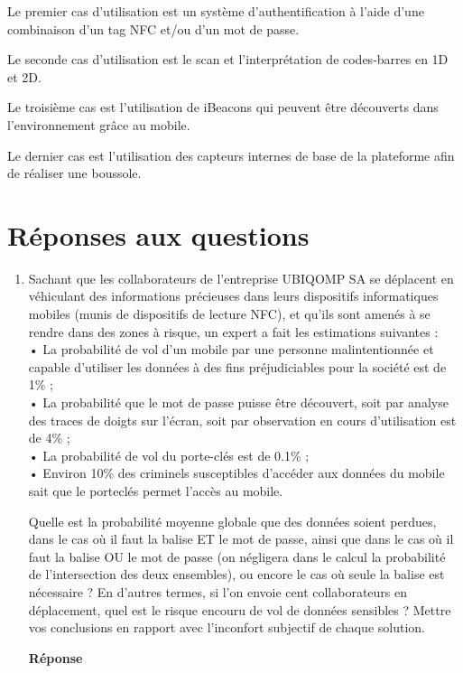 \documentclass[a4paper]{article}
\begin{document}
Le premier cas d'utilisation est un système d'authentification à l'aide d'une combinaison d'un tag NFC et/ou d'un mot de passe.

Le seconde cas d'utilisation est le scan et l'interprétation de codes-barres en 1D et 2D.

Le troisième cas est l'utilisation de iBeacons qui peuvent être découverts dans l'environnement grâce au mobile.

Le dernier cas est l'utilisation des capteurs internes de base de la plateforme afin de réaliser une boussole.

\section{Réponses aux questions}

\begin{enumerate}
	\item Sachant que les collaborateurs de l'entreprise UBIQOMP SA se déplacent en véhiculant des
    informations précieuses dans leurs dispositifs informatiques mobiles (munis de dispositifs de lecture NFC), et qu'ils sont amenés à se rendre dans des zones à risque, un expert a fait les estimations suivantes : \\
    • La probabilité de vol d'un mobile par une personne malintentionnée et capable d'utiliser
    les données à des fins préjudiciables pour la société est de 1\% ; \\
    • La probabilité que le mot de passe puisse être découvert, soit par analyse des traces de
    doigts sur l'écran, soit par observation en cours d'utilisation est de 4\% ; \\
    • La probabilité de vol du porte-clés est de 0.1\% ; \\
    • Environ 10\% des criminels susceptibles d'accéder aux données du mobile sait que le porteclés
    permet l’accès au mobile.
    
    Quelle est la probabilité moyenne globale que des données soient perdues, dans le cas où il faut la
    balise ET le mot de passe, ainsi que dans le cas où il faut la balise OU le mot de passe (on négligera dans le calcul la probabilité de l’intersection des deux ensembles), ou encore le cas où seule la balise est nécessaire ? En d'autres termes, si l'on envoie cent collaborateurs en déplacement, quel est le risque encouru de vol de données sensibles ? Mettre vos conclusions en rapport avec l'inconfort
    subjectif de chaque solution.
    
    \textbf{Réponse} \\
    

\end{enumerate}
\end{document}
